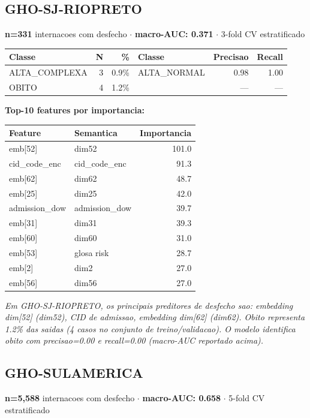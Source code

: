 \documentclass[11pt,a4paper]{article}
\begin{document}
\subsection{GHO-SJ-RIOPRETO}
\textbf{n=331} internacoes com desfecho $\cdot$ \textbf{macro-AUC: 0.371} $\cdot$ 3-fold CV estratificado

\begin{tabular}{lrr|lrr}
\toprule
Classe & N & \% & Classe & Precisao & Recall \\
\midrule
ALTA\_COMPLEXA & 3 & 0.9\% & ALTA\_NORMAL & 0.98 & 1.00 \\
OBITO & 4 & 1.2\% &  & --- & --- \\
\bottomrule
\end{tabular}

\vspace{4pt}\noindent\textbf{Top-10 features por importancia:}

\begin{tabular}{llr}
\toprule
Feature & Semantica & Importancia \\
\midrule
emb[52] & dim52 & 101.0 \\
cid\_code\_enc & cid\_code\_enc & 91.3 \\
emb[62] & dim62 & 48.7 \\
emb[25] & dim25 & 42.0 \\
admission\_dow & admission\_dow & 39.7 \\
emb[31] & dim31 & 39.3 \\
emb[60] & dim60 & 31.0 \\
emb[53] & glosa risk & 28.7 \\
emb[2] & dim2 & 27.0 \\
emb[56] & dim56 & 27.0 \\
\bottomrule
\end{tabular}

\vspace{4pt}\noindent\textit{Em GHO-SJ-RIOPRETO, os principais preditores de desfecho sao: embedding dim[52] (dim52), CID de admissao, embedding dim[62] (dim62). Obito representa 1.2\% das saidas (4 casos no conjunto de treino/validacao). O modelo identifica obito com precisao=0.00 e recall=0.00 (macro-AUC reportado acima).}

\subsection{GHO-SULAMERICA}
\textbf{n=5,588} internacoes com desfecho $\cdot$ \textbf{macro-AUC: 0.658} $\cdot$ 5-fold CV estratificado
\end{document}
